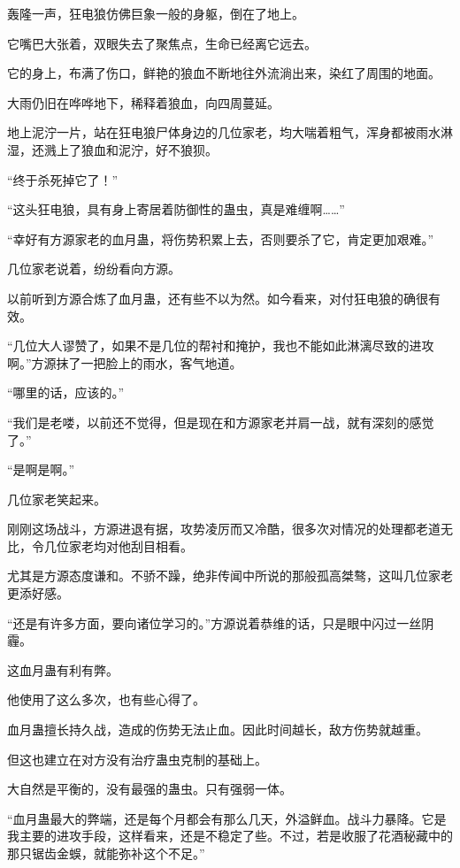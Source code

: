 
\begin{this_body}



轰隆一声，狂电狼仿佛巨象一般的身躯，倒在了地上。

它嘴巴大张着，双眼失去了聚焦点，生命已经离它远去。

它的身上，布满了伤口，鲜艳的狼血不断地往外流淌出来，染红了周围的地面。

大雨仍旧在哗哗地下，稀释着狼血，向四周蔓延。

地上泥泞一片，站在狂电狼尸体身边的几位家老，均大喘着粗气，浑身都被雨水淋湿，还溅上了狼血和泥泞，好不狼狈。

“终于杀死掉它了！”

“这头狂电狼，具有身上寄居着防御性的蛊虫，真是难缠啊……”

“幸好有方源家老的血月蛊，将伤势积累上去，否则要杀了它，肯定更加艰难。”

几位家老说着，纷纷看向方源。

以前听到方源合炼了血月蛊，还有些不以为然。如今看来，对付狂电狼的确很有效。

“几位大人谬赞了，如果不是几位的帮衬和掩护，我也不能如此淋漓尽致的进攻啊。”方源抹了一把脸上的雨水，客气地道。

“哪里的话，应该的。”

“我们是老喽，以前还不觉得，但是现在和方源家老并肩一战，就有深刻的感觉了。”

“是啊是啊。”

几位家老笑起来。

刚刚这场战斗，方源进退有据，攻势凌厉而又冷酷，很多次对情况的处理都老道无比，令几位家老均对他刮目相看。

尤其是方源态度谦和。不骄不躁，绝非传闻中所说的那般孤高桀骜，这叫几位家老更添好感。

“还是有许多方面，要向诸位学习的。”方源说着恭维的话，只是眼中闪过一丝阴霾。

这血月蛊有利有弊。

他使用了这么多次，也有些心得了。

血月蛊擅长持久战，造成的伤势无法止血。因此时间越长，敌方伤势就越重。

但这也建立在对方没有治疗蛊虫克制的基础上。

大自然是平衡的，没有最强的蛊虫。只有强弱一体。

“血月蛊最大的弊端，还是每个月都会有那么几天，外溢鲜血。战斗力暴降。它是我主要的进攻手段，这样看来，还是不稳定了些。不过，若是收服了花酒秘藏中的那只锯齿金蜈，就能弥补这个不足。”


\end{this_body}

